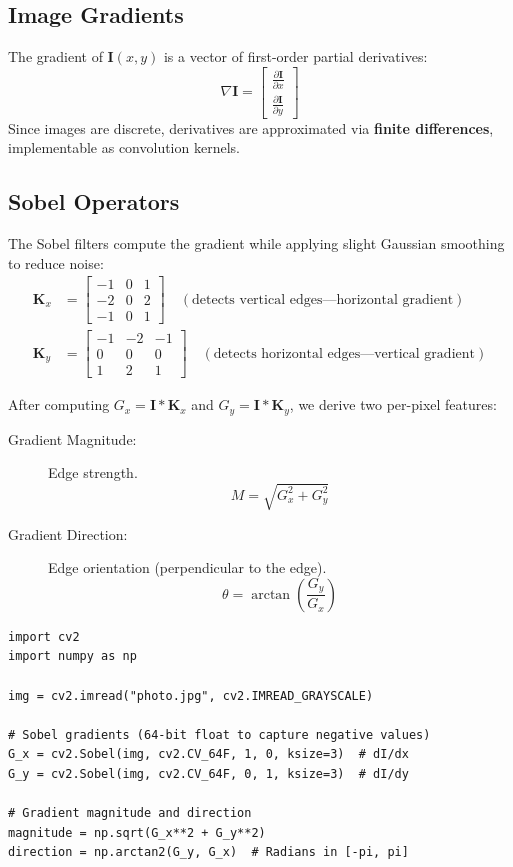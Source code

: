 \subsection*{Image Gradients}
The gradient of $\mathbf{I}(x,y)$ is a vector of first-order partial derivatives:
$$ \nabla \mathbf{I} = \begin{bmatrix} \frac{\partial \mathbf{I}}{\partial x} \\[4pt] \frac{\partial \mathbf{I}}{\partial y} \end{bmatrix} $$
Since images are discrete, derivatives are approximated via \textbf{finite differences}, implementable as convolution kernels.

\subsection*{Sobel Operators}
The Sobel filters compute the gradient while applying slight Gaussian smoothing to reduce noise:
\begin{align*}
\mathbf{K}_x &= \begin{bmatrix} -1 & 0 & 1 \\ -2 & 0 & 2 \\ -1 & 0 & 1 \end{bmatrix} \quad (\text{detects vertical edges---horizontal gradient}) \\[6pt]
\mathbf{K}_y &= \begin{bmatrix} -1 & -2 & -1 \\ 0 & 0 & 0 \\ 1 & 2 & 1 \end{bmatrix} \quad (\text{detects horizontal edges---vertical gradient})
\end{align*}

After computing $G_x = \mathbf{I} * \mathbf{K}_x$ and $G_y = \mathbf{I} * \mathbf{K}_y$, we derive two per-pixel features:
\begin{description}
    \item[Gradient Magnitude:] Edge strength.
    $$ M = \sqrt{G_x^2 + G_y^2} $$
    \item[Gradient Direction:] Edge orientation (perpendicular to the edge).
    $$ \theta = \arctan\!\left(\frac{G_y}{G_x}\right) $$
\end{description}

\begin{lstlisting}[style=pythonstyle]
import cv2
import numpy as np

img = cv2.imread("photo.jpg", cv2.IMREAD_GRAYSCALE)

# Sobel gradients (64-bit float to capture negative values)
G_x = cv2.Sobel(img, cv2.CV_64F, 1, 0, ksize=3)  # dI/dx
G_y = cv2.Sobel(img, cv2.CV_64F, 0, 1, ksize=3)  # dI/dy

# Gradient magnitude and direction
magnitude = np.sqrt(G_x**2 + G_y**2)
direction = np.arctan2(G_y, G_x)  # Radians in [-pi, pi]
\end{lstlisting}

